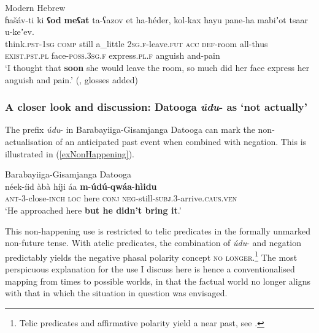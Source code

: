 \begin{exe}
	\ex Modern Hebrew\label{exAlmostHebrew}\\
	\gll ɦašáv-ti ki \textbf{ʕod} \textbf{meʕat} ta-ʕazov et ha-ħéder, kol-kax hayu pane-ha mabiʼot tsaar u-keʼev.\\
	think.\textsc{pst}-1\textsc{sg} \textsc{comp} still a\_little 2\textsc{sg}.\textsc{f}-leave.\textsc{fut} \textsc{acc} \textsc{def}-room all-thus \textsc{exist}.\textsc{pst}.\textsc{pl} face-\textsc{poss}.3\textsc{sg}.\textsc{f} express.\textsc{pl}.\textsc{f} anguish and-pain\\
	\glt \lq I thought that \textbf{soon} she would leave the room, so much did her face express her anguish and pain.\rq{ }(\cite[550]{Glinert1989}, glosses added)
\end{exe}

\subsubsection[tocentry={}]{A closer look and discussion: Datooga \mbox{\textit{údu}-} as \lq not actually\rq{}} The prefix \mbox{\textit{údu}-} in Barabayiiga-Gisamjanga Datooga can mark the non\hyp actualisation of an anticipated past event when combined with negation. This is illustrated in (\ref{exNonHappening}).

\begin{exe}
	\ex Barabayiiga-Gisamjanga Datooga\label{exNonHappening}\\
	 \gll [N-ì-]néek-íid àbà híji áa \textbf{m}-\textbf{údú}-\textbf{qwáa}-\textbf{hìidu}\\
\textsc{ant}-3-close-\textsc{inch} \textsc{loc} here \textsc{conj} \textsc{neg}-still-\textsc{subj}.3-arrive.\textsc{caus.ven}\\
	\glt \lq He approached here \textbf{but he didn't bring it}.' \parencite[431]{Mitchell2021}
\end{exe}

This non-happening use is restricted to telic predicates in the formally unmarked non-future tense. With atelic predicates, the combination of \mbox{\textit{údu}-} and negation predictably yields the negative phasal polarity concept \textsc{no longer}.\footnote{Telic predicates and affirmative polarity yield a near past, see .} The most perspicuous explanation for the use I discuss here is hence a conventionalised mapping from times to possible worlds, in that the factual world no longer aligns with that in which the situation in question was envisaged.


